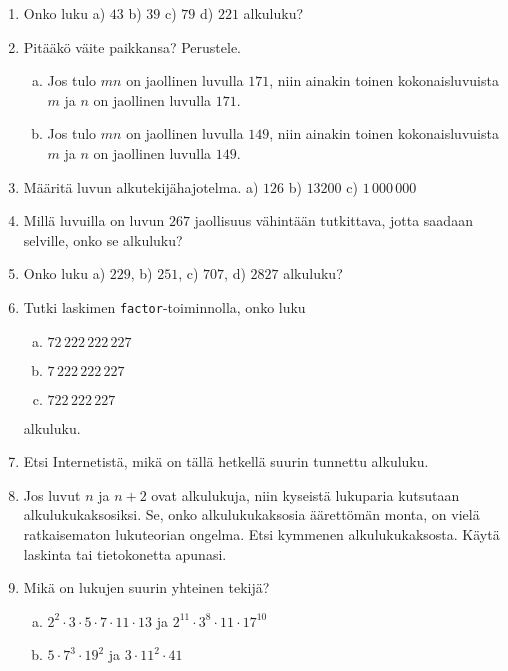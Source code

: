 \begin{enumerate}

\item Onko luku a) $43$ b) $39$ c) $79$ d) $221$ alkuluku?

\item Pitääkö väite paikkansa? Perustele.
\begin{enumerate}[a)]
\item Jos tulo $mn$ on jaollinen luvulla $171$, niin ainakin
toinen kokonaisluvuista $m$ ja $n$ on jaollinen luvulla $171$.

\item Jos tulo $mn$ on jaollinen luvulla $149$, niin ainakin
toinen kokonaisluvuista $m$ ja $n$ on jaollinen luvulla $149$.
\end{enumerate}

\item Määritä luvun alkutekijähajotelma. a) $126$ b) $13200$ c)
$1\, 000\, 000$

\item Millä luvuilla on luvun $267$ jaollisuus vähintään
tutkittava, jotta saadaan selville, onko se alkuluku?

\item Onko luku a) $229$, b) $251$, c) $707$, d) $2827$ alkuluku?

\item Tutki laskimen {\tt factor}-toiminnolla, onko luku
\begin{enumerate}[a)]
\item $72\,222\,222\,227$
\item $7\,222\,222\,227$
\item $722\,222\,227$
\end{enumerate}
alkuluku.

\item Etsi Internetistä, mikä on tällä hetkellä suurin tunnettu
alkuluku.

\item
Jos luvut $n$ ja $n + 2$ ovat alkulukuja, niin kyseistä lukuparia
kutsutaan alkulukukaksosiksi. Se, onko alkulukukaksosia
äärettömän monta, on vielä ratkaisematon lukuteorian ongelma.
Etsi kymmenen alkulukukaksosta. Käytä laskinta tai tietokonetta
apunasi.

\item Mikä on lukujen suurin yhteinen tekijä?
\begin{enumerate}[a)]
\item $2^2 \cdot 3 \cdot 5 \cdot 7 \cdot 11 \cdot 13$ ja
$2^{11} \cdot 3^8 \cdot 11 \cdot 17^{10}$
\item $5 \cdot 7^3 \cdot 19^2$ ja $3 \cdot 11^2 \cdot 41$
\end{enumerate}


\end{enumerate}
